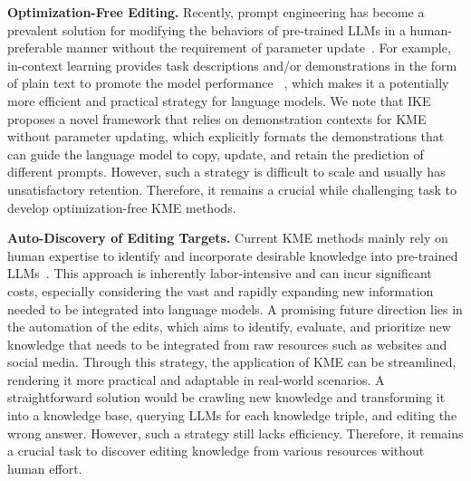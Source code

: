 \documentclass[acmsmall, screen]{acmart}
\begin{document}
\vspace{0.05in}\noindent\textsf{\textbf{Optimization-Free Editing.}}
Recently, prompt engineering has become a prevalent solution for modifying the behaviors of pre-trained LLMs in a human-preferable manner without the requirement of parameter update~\cite{dong2022survey}. For example, in-context learning provides task descriptions and/or demonstrations in the form of plain text to promote the model performance ~\cite{brown2020language}, which makes it a potentially more efficient and practical strategy for language models. We note that IKE~\cite{IKE} proposes a novel framework that relies on demonstration contexts for KME without parameter updating, which explicitly formats the demonstrations that can guide the language model to copy, update, and retain the prediction of different prompts. However, such a strategy is difficult to scale and usually has unsatisfactory retention. Therefore, it remains a crucial while challenging task to develop optimization-free KME methods.

\vspace{0.05in}\noindent\textsf{\textbf{Auto-Discovery of Editing Targets.}}
Current KME methods mainly rely on human expertise to identify and incorporate desirable knowledge into pre-trained LLMs~\cite{yao2023editing,wu2024updating,zhang2024comprehensive}. This approach is inherently labor-intensive and can incur significant costs, especially considering the vast and rapidly expanding new information needed to be integrated into language models. A promising future direction lies in the automation of the edits, which aims to identify, evaluate, and prioritize new knowledge that needs to be integrated from raw resources such as websites and social media. Through this strategy, the application of KME can be streamlined, rendering it more practical and adaptable in real-world scenarios. A straightforward solution would be crawling new knowledge and transforming it into a knowledge base, querying LLMs for each knowledge triple, and editing the wrong answer. However, such a strategy still lacks efficiency. Therefore, it remains a crucial task to discover editing knowledge from various resources without human effort.




\end{document}
